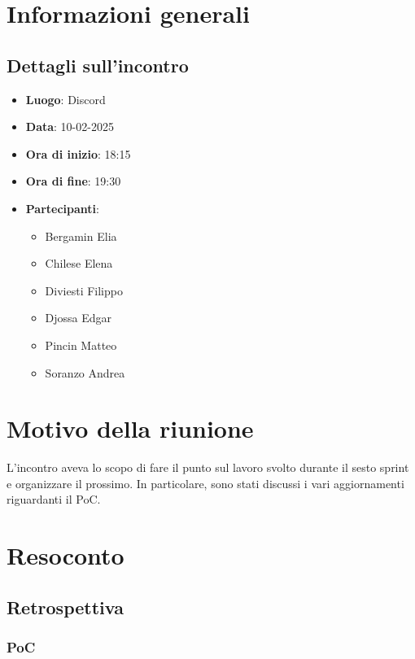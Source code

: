 \section{Informazioni generali}

\subsection{Dettagli sull'incontro}

\begin{itemize}
    \item \textbf{Luogo}: Discord
    \item \textbf{Data}: 10-02-2025
    \item \textbf{Ora di inizio}: 18:15
    \item \textbf{Ora di fine}: 19:30
    \item \textbf{Partecipanti}:
    \begin{itemize}
        \item Bergamin Elia
        \item Chilese Elena
        \item Diviesti Filippo
        \item Djossa Edgar
        \item Pincin Matteo
        \item Soranzo Andrea  
    \end{itemize}
\end{itemize}

\section{Motivo della riunione}

L'incontro aveva lo scopo di fare il punto sul lavoro svolto durante il sesto sprint e organizzare il prossimo. In particolare, sono stati discussi i vari aggiornamenti riguardanti il PoC.

\section{Resoconto}

\subsection{Retrospettiva}

\subsubsection{PoC}


